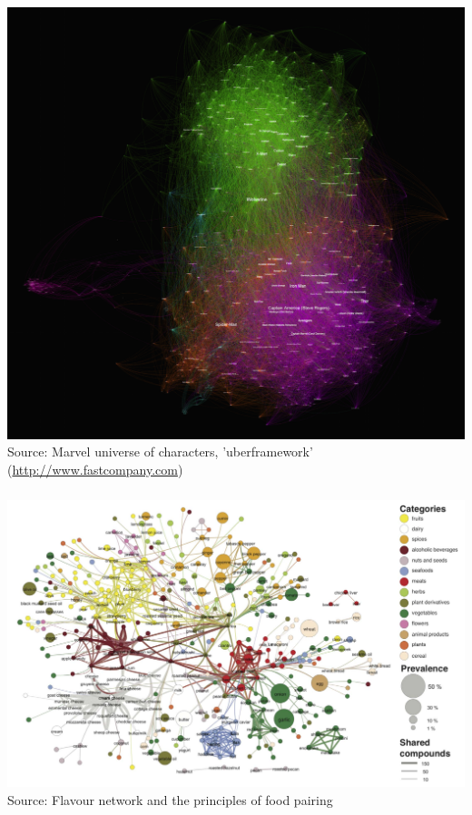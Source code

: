 \documentclass[8pt]{beamer}
\begin{document}

\begin{frame}
\frametitle{\insertsection}
\centering
\includegraphics[width=\linewidth,height=0.8\textheight,keepaspectratio]{marvel}\\
\tiny Source: Marvel universe of characters, 'uberframework' (\url{http://www.fastcompany.com})
\end{frame}


\begin{frame}
\frametitle{\insertsection}
\centering
\includegraphics[width=\linewidth,height=0.9\textheight,keepaspectratio]{food}\\
\tiny Source: Flavour network and the principles of food pairing \cite{Ahn2011}
\end{frame}
\end{document}
